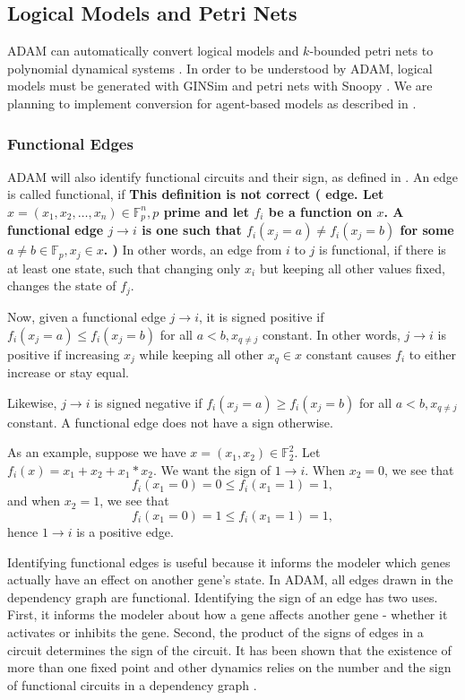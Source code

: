 \documentclass[11pt]{amsart}
\begin{document}
\subsection{Logical Models and Petri Nets}
ADAM can automatically convert logical models and $k$-bounded petri nets to
polynomial dynamical systems \cite{Alan:Bioinf2010}. In order to be understood
by ADAM, logical models must be
generated with GINSim \cite{GINsim} and petri nets with Snoopy \cite{Snoopy}.
We are planning to implement conversion for agent-based models as described in
\cite{Hinkelmann:2010}.

\subsubsection{Functional Edges}
ADAM will also identify functional circuits and their sign, as defined in \cite{Chaouiya}.
An edge is called functional, if {\bf This definition is not correct ( edge. Let $x = (x_1, x_2, \ldots, x_n) \in \mathbb{F}^n_p, p$ prime and let $f_i$ be a function on $x$. A functional edge $j \rightarrow i$ is one such that
$f_i(x_j = a) \neq f_i(x_j = b)$ for some $a \neq b \in \mathbb{F}_p, x_j \in
x$. ) }
In other words, an edge from $i$ to $j$ is functional, if there is at least
one state, such that changing only $x_i$ but keeping all other values fixed,
changes the state of $f_j$.

Now, given a functional edge $j \rightarrow i$, it is signed positive if $f_i(x_j = a) \leq f_i(x_j = b)$ for all $a < b, x_{q \neq j}$ constant. In other words, $j \rightarrow i$ is positive if increasing $x_j$ while keeping all other $x_q \in x$ constant causes $f_i$ to either increase or stay equal.

Likewise, $j \rightarrow i$ is signed negative if $f_i(x_j = a) \geq f_i(x_j = b)$ for all $a < b, x_{q \neq j}$ constant. A functional edge does not have a sign otherwise.

As an example, suppose we have $x = (x_1, x_2) \in \mathbb{F}^2_2$. Let $f_i(x) = x_1+x_2+x_1*x_2$. We want the sign of $1 \rightarrow i$. When $x_2 = 0$, we see that
\[ f_i(x_1 = 0) = 0 \leq f_i(x_1 = 1) = 1, \]
and when $x_2 = 1$, we see that
\[ f_i(x_1 = 0) = 1 \leq f_i(x_1 = 1) = 1, \]
hence $1 \rightarrow i$ is a positive edge.

Identifying functional edges is useful because it informs the modeler which genes actually have an effect on another gene's state. In ADAM, all edges drawn in the dependency graph are functional.  Identifying the sign of an edge has two uses. First, it informs the modeler about how a gene affects another gene - whether it activates or inhibits the gene. Second, the product of the signs of edges in a circuit determines the sign of the circuit. It has been shown that the existence of more than one fixed point and other dynamics relies on the number and the sign of functional circuits in a dependency graph \cite{Thomas:2001}\cite{Remy:2005}.
\end{document}
